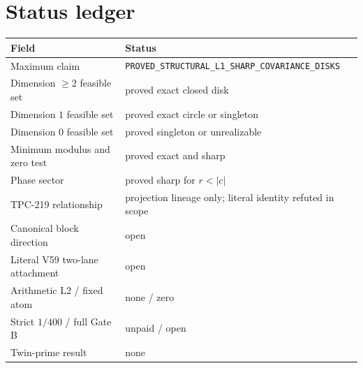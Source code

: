 \section{Status ledger}

\begin{center}
\begin{tabularx}{\textwidth}{@{}lX@{}}
\toprule
Field & Status \\
\midrule
Maximum claim & \texttt{PROVED\_STRUCTURAL\_L1\_SHARP\_COVARIANCE\_DISKS} \\
Dimension $\ge2$ feasible set & proved exact closed disk \\
Dimension $1$ feasible set & proved exact circle or singleton \\
Dimension $0$ feasible set & proved singleton or unrealizable \\
Minimum modulus and zero test & proved exact and sharp \\
Phase sector & proved sharp for $r<|c|$ \\
TPC-219 relationship & projection lineage only; literal identity refuted in scope \\
Canonical block direction & open \\
Literal V59 two-lane attachment & open \\
Arithmetic L2 / fixed atom & none / zero \\
Strict $1/400$ / full Gate B & unpaid / open \\
Twin-prime result & none \\
\bottomrule
\end{tabularx}
\end{center}
